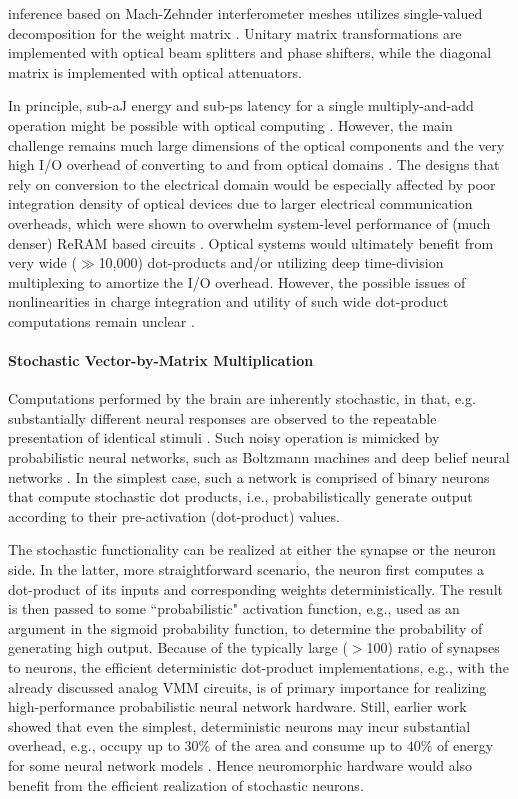 inference based on Mach-Zehnder interferometer meshes utilizes single-valued decomposition for the weight matrix \cite{Shen2017NatPhot}. Unitary matrix transformations are implemented with optical beam splitters and phase shifters, while the diagonal matrix is implemented with optical attenuators. 

In principle, sub-aJ energy and sub-ps latency for a single multiply-and-add operation might be possible with optical computing \cite{Hamley2019}. However, the main challenge remains much large dimensions of the optical components and the very high I/O overhead of converting to and from optical domains \cite{Berggren2020, Shasti2021, Hamley2019}. The designs that rely on conversion to the electrical domain would be especially affected by poor integration density of optical devices due to larger electrical communication overheads, which were shown to overwhelm system-level performance of (much denser) ReRAM based circuits \cite{Bavandpour2018}. Optical systems would ultimately benefit from very wide ($\gg$10,000) dot-products and/or utilizing deep time-division multiplexing to amortize the I/O overhead. However, the possible issues of nonlinearities in charge integration and utility of such wide dot-product computations remain unclear \cite{Hamley2019}.  

\paragraph*{Stochastic Vector-by-Matrix Multiplication}

Computations performed by the brain are inherently stochastic, in that, e.g. substantially different neural responses are observed to the repeatable presentation of identical stimuli \cite{Rolls2010}. Such noisy operation is mimicked by probabilistic neural networks, such as Boltzmann machines \cite{Hinton1983} and deep belief neural networks \cite{Hinton2009}. In the simplest case, such a network is comprised of binary neurons that compute stochastic dot products, i.e., probabilistically generate output according to their pre-activation (dot-product) values. 

The stochastic functionality can be realized at either the synapse or the neuron side. In the latter, more straightforward scenario, the neuron first computes a dot-product of its inputs and corresponding weights deterministically. The result is then passed to some ``probabilistic" activation function, e.g., used as an argument in the sigmoid probability function, to determine the probability of generating high output. Because of the typically large ($>$100) ratio of synapses to neurons, the efficient deterministic dot-product implementations, e.g., with the already discussed analog VMM circuits, is of primary importance for realizing high-performance probabilistic neural network hardware. Still, earlier work showed that even the simplest, deterministic neurons may incur substantial overhead, e.g., occupy up to $30\%$ of the area and consume up to $40\%$ of energy for some neural network models \cite{Bavandpour2018}. Hence neuromorphic hardware would also benefit from the efficient realization of stochastic neurons.

